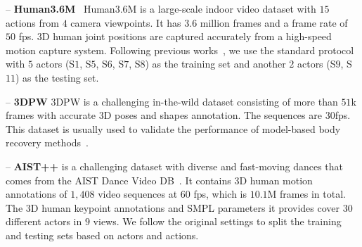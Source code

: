 \documentclass[runningheads]{llncs}
\begin{document}
\noindent -- \textbf{Human3.6M}~\cite{ionescu2013human3} Human3.6M is a large-scale indoor video dataset with $15$ actions from $4$ camera viewpoints. It has $3.6$ million frames and a frame rate of $50$ fps. 3D human joint positions are captured accurately from a high-speed motion capture system. Following previous works~\cite{zeng2020srnet,martinez2017simple,pavllo20193d,zeng2021smoothnet}, we use the standard protocol with $5$ actors (S$1$, S$5$, S$6$, S$7$, S$8$) as the training set and another $2$ actors (S$9$, S$11$) as the testing set. 

\noindent -- \textbf{3DPW} \cite{von2018recovering} 3DPW is a challenging in-the-wild dataset consisting of more than $51$k frames with accurate 3D poses and shapes annotation. The sequences are $30$fps. This dataset is usually used to validate the performance of model-based body recovery methods~\cite{kanazawa2018hmr,kolotouros2019spin,joo2020eft,kocabas2021pare}.


\noindent -- \textbf{AIST++} \cite{li2021aist} is a challenging dataset with diverse and fast-moving dances that comes from the AIST Dance Video DB~\cite{tsuchida2019aist}. It contains 3D human motion annotations of $1,408$ video sequences at $60$ fps, which is $10.1$M frames in total. The 3D human keypoint annotations and SMPL parameters it provides cover $30$ different actors in $9$ views. We follow the original settings to split the training and testing sets based on actors and actions.
\end{document}
